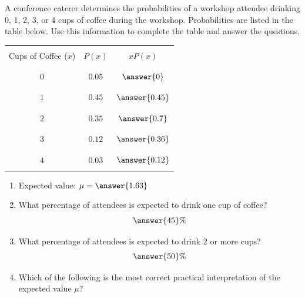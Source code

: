 \documentclass{ximera}
\begin{document}
\begin{problem}\label{prob:140hom4prob2}
A conference caterer determines the probabilities of a workshop attendee drinking 0, 1, 2, 3, or 4 cups of coffee during the workshop.  Probabilities are listed in the table below.  Use this information to complete the table and answer the questions.

\begin{center}
\begin{tabular}{|c|c|c|}
 \hline
 &&    \\
 Cups of Coffee ($x$) & $P(x)$& $xP(x)$  \\
 &&   \\
  \hline
  &&  \\
 \quad$0$\quad&$0.05$&$\answer{0}$ \\
  && \\
 \hline
  && \\
 \quad $1$&$0.45$&$\answer{0.45}$  \\
  && \\
 \hline
  && \\
  \quad $2$&$0.35$& $\answer{0.7}$  \\
  && \\
 \hline
  & &\\
 \quad $3$& $0.12$&$\answer{0.36}$  \\
  &&\\
 \hline
  & &\\
 \quad $4$&$0.03$ & $\answer{0.12}$ \\
  &&\\
 \hline
\end{tabular}
\end{center}

\begin{enumerate}
    \item Expected value: $\mu=\answer{1.63}$
    \item What percentage of attendees is expected to drink one cup of coffee?
$$\answer{45}\%$$
\item What percentage of attendees is expected to drink 2 or more cups?
$$\answer{50}\%$$
    \item Which of the following is the most correct practical interpretation of the expected value $\mu$?
    \begin{multipleChoice}  
   
\end{multipleChoice}
\end{enumerate}

\end{problem}
\end{document}
